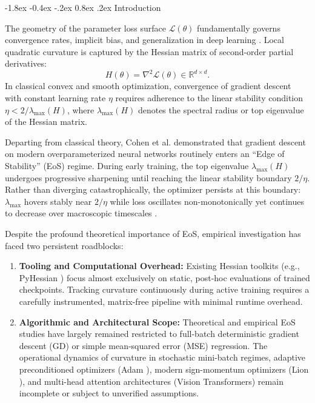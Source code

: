 \documentclass[10pt,twocolumn]{article}
\makeatletter
\renewcommand\section{\@startsection {section}{1}{\z@}%
                                   {-1.8ex \@plus -0.4ex \@minus -.2ex}%
                                   {0.8ex \@plus .2ex}%
                                   {\normalfont\large\bfseries}}
\makeatother
\begin{document}
\section{Introduction}

The geometry of the parameter loss surface $\mathcal{L}(\theta)$ fundamentally governs convergence rates, implicit bias, and generalization in deep learning \cite{keskar2017large, li2018visualizing}. Local quadratic curvature is captured by the Hessian matrix of second-order partial derivatives:
\begin{equation}
H(\theta) = \nabla^2 \mathcal{L}(\theta) \in \mathbb{R}^{d \times d}.
\end{equation}
In classical convex and smooth optimization, convergence of gradient descent with constant learning rate $\eta$ requires adherence to the linear stability condition $\eta < 2/\lambda_{\max}(H)$, where $\lambda_{\max}(H)$ denotes the spectral radius or top eigenvalue of the Hessian matrix.

Departing from classical theory, Cohen et al. \cite{cohen2021gradient} demonstrated that gradient descent on modern overparameterized neural networks routinely enters an ``Edge of Stability'' (EoS) regime. During early training, the top eigenvalue $\lambda_{\max}(H)$ undergoes progressive sharpening until reaching the linear stability boundary $2/\eta$. Rather than diverging catastrophically, the optimizer persists at this boundary: $\lambda_{\max}$ hovers stably near $2/\eta$ while loss oscillates non-monotonically yet continues to decrease over macroscopic timescales \cite{damian2023self}.

Despite the profound theoretical importance of EoS, empirical investigation has faced two persistent roadblocks:
\begin{enumerate}
    \item \textbf{Tooling and Computational Overhead:} Existing Hessian toolkits (e.g., PyHessian \cite{yao2020pyhessian}) focus almost exclusively on static, post-hoc evaluations of trained checkpoints. Tracking curvature continuously during active training requires a carefully instrumented, matrix-free pipeline with minimal runtime overhead.
    \item \textbf{Algorithmic and Architectural Scope:} Theoretical and empirical EoS studies have largely remained restricted to full-batch deterministic gradient descent (GD) or simple mean-squared error (MSE) regression. The operational dynamics of curvature in stochastic mini-batch regimes, adaptive preconditioned optimizers (Adam \cite{kingma2015adam}), modern sign-momentum optimizers (Lion \cite{chen2023symbolic}), and multi-head attention architectures (Vision Transformers) remain incomplete or subject to unverified assumptions.
\end{enumerate}
\end{document}
